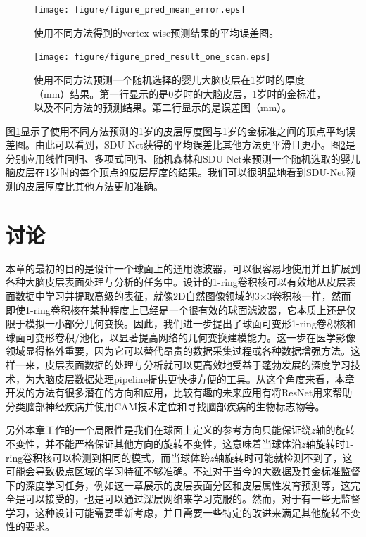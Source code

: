 \begin{figure}[t]
	\centering
	\texttt{[image: figure/figure\_pred\_mean\_error.eps]}
	\caption{使用不同方法得到的vertex-wise预测结果的平均误差图。}
	\label{fig:thickness_prediction_mean_error}
\end{figure}

\begin{figure}[t]
	\centering
	\texttt{[image: figure/figure\_pred\_result\_one\_scan.eps]}
	\caption{使用不同方法预测一个随机选择的婴儿大脑皮层在1岁时的厚度（mm）结果。第一行显示的是0岁时的大脑皮层，1岁时的金标准，以及不同方法的预测结果。第二行显示的是误差图（mm）。}
	\label{fig:thickness_prediction_result_one_scan}
\end{figure}

图\ref{fig:thickness_prediction_mean_error}显示了使用不同方法预测的1岁的皮层厚度图与1岁的金标准之间的顶点平均误差图。由此可以看到，SDU-Net获得的平均误差比其他方法更平滑且更小。图\ref{fig:thickness_prediction_result_one_scan}是分别应用线性回归、多项式回归、随机森林和SDU-Net来预测一个随机选取的婴儿脑皮层在1岁时的每个顶点的皮层厚度的结果。我们可以很明显地看到SDU-Net预测的皮层厚度比其他方法更加准确。


\section{讨论}
本章的最初的目的是设计一个球面上的通用滤波器，可以很容易地使用并且扩展到各种大脑皮层表面处理与分析的任务中。设计的1-ring卷积核可以有效地从皮层表面数据中学习并提取高级的表征，就像2D自然图像领域的3$\times$3卷积核一样，然而即使1-ring卷积核在某种程度上已经是一个很有效的球面滤波器，它本质上还是仅限于模拟一小部分几何变换。因此，我们进一步提出了球面可变形1-ring卷积核和球面可变形卷积/池化，以显著提高网络的几何变换建模能力。这一步在医学影像领域显得格外重要，因为它可以替代昂贵的数据采集过程或各种数据增强方法。这样一来，皮层表面数据的处理与分析就可以更高效地受益于蓬勃发展的深度学习技术，为大脑皮层数据处理pipeline提供更快捷方便的工具。从这个角度来看，本章开发的方法有很多潜在的方向和应用，比较有趣的未来应用有将ResNet\cite{he2016deep}用来帮助分类脑部神经疾病并使用CAM技术\cite{zhou2015cnnlocalization}定位和寻找脑部疾病的生物标志物等。

另外本章工作的一个局限性是我们在球面上定义的参考方向只能保证绕$z$轴的旋转不变性，并不能严格保证其他方向的旋转不变性，这意味着当球体沿$z$轴旋转时1-ring卷积核可以检测到相同的模式，而当球体跨$z$轴旋转时可能就检测不到了，这可能会导致极点区域的学习特征不够准确。不过对于当今的大数据及其金标准监督下的深度学习任务，例如这一章展示的皮层表面分区和皮层属性发育预测等，这完全是可以接受的，也是可以通过深层网络来学习克服的。然而，对于有一些无监督学习，这种设计可能需要重新考虑，并且需要一些特定的改进来满足其他旋转不变性的要求。

